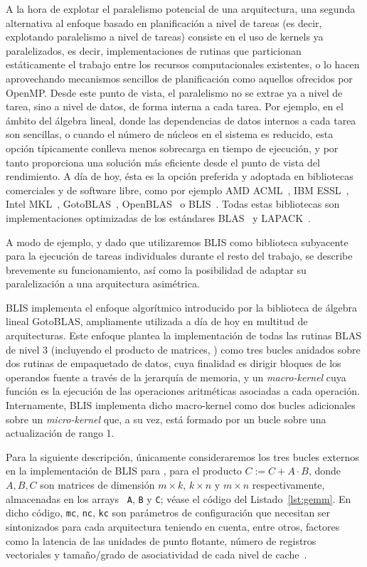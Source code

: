 A la hora de explotar el paralelismo potencial de una arquitectura, una
segunda alternativa al enfoque basado en planificación a nivel de tareas (es
decir, explotando paralelismo a nivel de tareas) consiste en el uso de
kernels ya paralelizados, es decir, implementaciones de rutinas que
particionan estáticamente el trabajo entre los recursos computacionales
existentes, o lo hacen aprovechando mecanismos sencillos de planificación
como aquellos ofrecidos por OpenMP. Desde este punto de vista, el
paralelismo no se extrae ya a nivel de tarea, sino a nivel de datos, de
forma interna a cada tarea. Por ejemplo, en el ámbito del álgebra lineal,
donde las dependencias de datos internos a cada tarea son sencillas, o
cuando el número de núcleos en el sistema es reducido, esta opción
típicamente conlleva menos sobrecarga en tiempo de ejecución, y por tanto
proporciona una solución más eficiente desde el punto de vista del
rendimiento. A día de hoy, ésta es la opción preferida y adoptada en
bibliotecas comerciales y de software libre, como por ejemplo AMD
ACML~\cite{ACML}, IBM ESSL~\cite{ESSL}, Intel MKL~\cite{mkl},
GotoBLAS~\cite{Goto:2008:AHP}, OpenBLAS~\cite{OpenBLAS} o
BLIS~\cite{BLIS1}. Todas estas bibliotecas son implementaciones optimizadas
de los estándares BLAS~\cite{blas1,blas2,blas3} y LAPACK~\cite{lapack}.

A modo de ejemplo, y dado que utilizaremos BLIS como biblioteca subyacente para la ejecución de tareas
individuales durante el resto del trabajo, se describe brevemente su funcionamiento, así como la posibilidad
de adaptar su paralelización a una arquitectura asimétrica.

BLIS implementa el enfoque algorítmico introducido por la biblioteca de álgebra lineal GotoBLAS, ampliamente
utilizada a día de hoy en multitud de arquitecturas. Este enfoque plantea la implementación de todas las rutinas
BLAS de nivel 3 (incluyendo el producto de matrices, \gemm) como tres bucles anidados sobre dos rutinas de 
empaquetado de datos, cuya finalidad es dirigir bloques de los operandos fuente a través de la jerarquía
de memoria, y un {\em macro-kernel} cuya función es la ejecución de las operaciones aritméticas asociadas
a cada operación. Internamente, BLIS implementa dicho macro-kernel como dos bucles adicionales sobre un 
{\em micro-kernel} que, a su vez, está formado por un bucle sobre una actualización de rango 1.

Para la siguiente descripción, únicamente consideraremos los tres bucles
externos en la implementación de BLIS para \gemm, para el producto
$C:=C+A\cdot B$, donde $A,B,C$ son matrices de dimensión $m \times k$,
$k\times n$ y $m \times n$ respectivamente, almacenadas en los arrays {\tt
  A}, {\tt B} y {\tt C}; véase el código del Listado~\ref{lst:gemm}.  En
dicho código, {\tt mc}, {\tt nc}, {\tt kc} son parámetros de configuración
que necesitan ser sintonizados para cada arquitectura teniendo en cuenta,
entre otros, factores como la latencia de las unidades de punto flotante,
número de registros vectoriales y tamaño/grado de asociatividad de cada
nivel de cache~\cite{BLIS4}.

